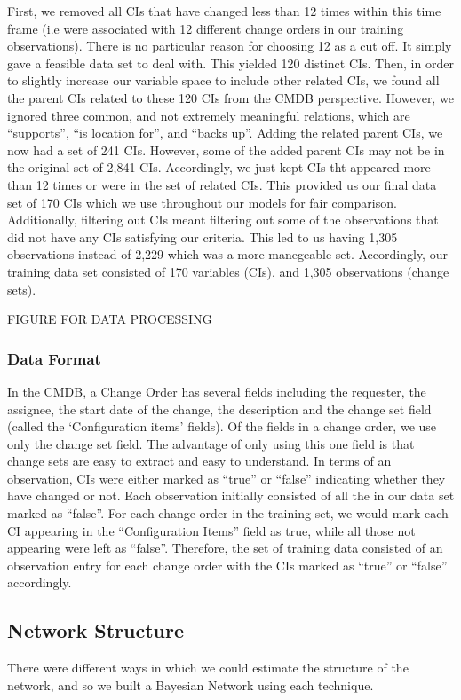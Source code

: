 \documentclass{article}
\begin{document}
First, we removed all CIs that have changed less than 12 times within this time frame  (i.e were associated with 12 different change orders in our training
observations). There is no particular reason for choosing 12 as a cut off. It simply gave a feasible data set to deal with. This yielded 120 distinct CIs. Then,
in order to slightly increase our variable space to include other related CIs, we found all the parent CIs related to these 120 CIs from the CMDB perspective.
However, we ignored three common, and not extremely meaningful relations, which are  ``supports'', ``is location for'', and ``backs up''. Adding the related
parent CIs, we now had a set of 241 CIs. However, some of the added parent CIs may not be in the original set of 2,841 CIs. Accordingly, we just kept CIs tht
appeared more than 12 times or were in the set of related CIs. This provided us our final data set of 170 CIs which we use throughout our models for fair
comparison. Additionally, filtering out CIs meant filtering out some of the observations that did not have any CIs satisfying our criteria. This led to us
having 1,305 observations instead of 2,229 which was a more manegeable set. Accordingly, our training data set consisted of 170 variables (CIs), and 1,305
observations (change sets).

FIGURE FOR DATA PROCESSING

\subsubsection*{Data Format}
\label{sec:format}

In the CMDB, a Change Order has several fields including the requester, the assignee, the start date of the change, the description and the change set field
(called the `Configuration items' fields). Of the fields in a change order, we use only the change set field. The advantage of only using this one field is that
change sets are easy to extract and easy to understand. In terms of an observation, CIs were either marked as ``true'' or ``false'' indicating whether they
have changed or not. Each observation initially consisted of all the in our data set marked as ``false''. For each change order in the training set, we would
mark each CI appearing in the ``Configuration Items'' field as true, while all those not appearing were left as ``false''. Therefore, the set of training
data consisted of an observation entry for each change order with the CIs marked as ``true'' or ``false'' accordingly.

\subsection{Network Structure}
\label{sec:structure}
There were different ways in which we could estimate the structure of the network, and so we built a Bayesian Network using each technique.
\end{document}
